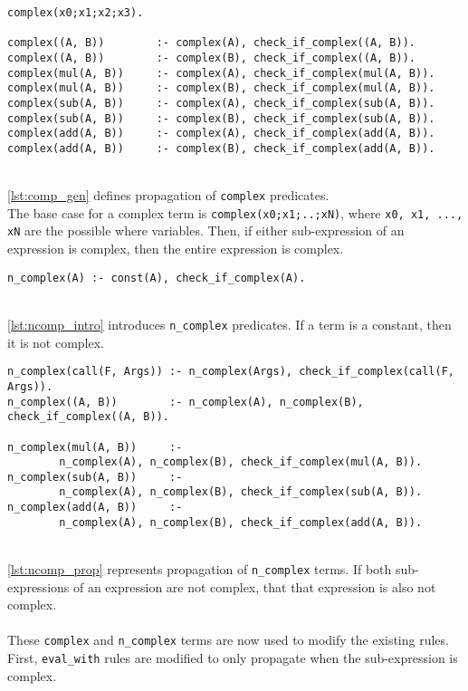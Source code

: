 \begin{lstlisting}[caption={Complex generation}, label={lst:comp_gen}, firstnumber=100]
complex(x0;x1;x2;x3).

complex((A, B))        :- complex(A), check_if_complex((A, B)).
complex((A, B))        :- complex(B), check_if_complex((A, B)).
complex(mul(A, B))     :- complex(A), check_if_complex(mul(A, B)).
complex(mul(A, B))     :- complex(B), check_if_complex(mul(A, B)).
complex(sub(A, B))     :- complex(A), check_if_complex(sub(A, B)).
complex(sub(A, B))     :- complex(B), check_if_complex(sub(A, B)).
complex(add(A, B))     :- complex(A), check_if_complex(add(A, B)).
complex(add(A, B))     :- complex(B), check_if_complex(add(A, B)).
\end{lstlisting}
\mbox{} \\
\ref{lst:comp_gen} defines propagation of \lstinline!complex! predicates. \\
The base case for a complex term is \lstinline!complex(x0;x1;..;xN)!, where \lstinline!x0, x1, ..., xN! are the possible where variables. Then, if either sub-expression of an expression is complex, then the entire expression is complex. \\

\begin{lstlisting}[caption={Non complex introduction}, label={lst:ncomp_intro}, firstnumber=111]
n_complex(A) :- const(A), check_if_complex(A).
\end{lstlisting}
\mbox{} \\
\ref{lst:ncomp_intro} introduces \lstinline!n_complex! predicates. If a term is a constant, then it is not complex. \\

\begin{lstlisting}[caption={Non complex propagation}, label={lst:ncomp_prop}, firstnumber=113]
n_complex(call(F, Args)) :- n_complex(Args), check_if_complex(call(F, Args)).
n_complex((A, B))        :- n_complex(A), n_complex(B), check_if_complex((A, B)).

n_complex(mul(A, B))     :- 
		n_complex(A), n_complex(B), check_if_complex(mul(A, B)).
n_complex(sub(A, B))     :- 
		n_complex(A), n_complex(B), check_if_complex(sub(A, B)).
n_complex(add(A, B))     :- 
		n_complex(A), n_complex(B), check_if_complex(add(A, B)).
\end{lstlisting}
\mbox{} \\
\ref{lst:ncomp_prop} represents propagation of \lstinline!n_complex! terms. If both sub-expressions of an expression are not complex, that that expression is also not complex. \\ \\
These \lstinline!complex! and \lstinline!n_complex! terms are now used to modify the existing rules. First, \lstinline!eval_with! rules are modified to only propagate when the sub-expression is complex. \\

